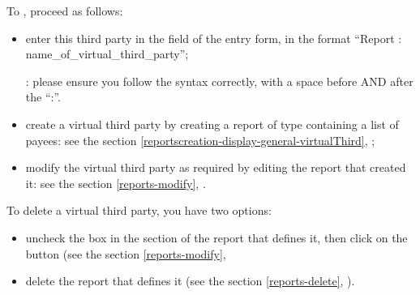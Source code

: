 To , proceed as follows:
\begin{itemize}
	\item enter this third party in the  field of the entry form, in the format \enquote{Report : name\_of\_virtual\_third\_party};
	
	\Note{}: please ensure you follow the syntax correctly, with a space before AND after the \enquote{:}.
	\item create a virtual third party by creating a report of type  containing a list of payees: see the section \vref{reportscreation-display-general-virtualThird}, ;
	\item modify the virtual third party as required by editing the report that created it: see the section \vref{reports-modify}, .
\end{itemize}

To delete a virtual third party, you have two options:
\begin{itemize}
	\item uncheck the  box in the  section of the report that defines it, then click on the  button (see the section \vref{reports-modify},
	\item delete the report that defines it (see the section \vref{reports-delete}, ).
\end{itemize}


